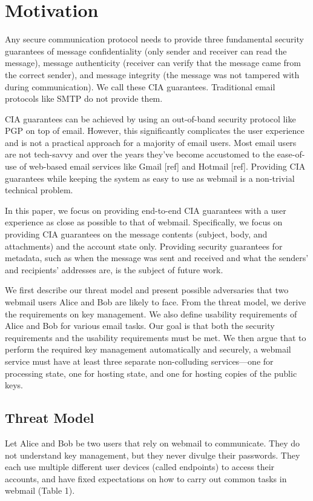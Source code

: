 \section{Motivation}

Any secure communication protocol needs to provide three 
fundamental security guarantees of message confidentiality 
(only sender and receiver can read the message), message 
authenticity (receiver can verify that the message came 
from the correct sender), and message integrity (the message 
was not tampered with during communication). We call these 
CIA guarantees. Traditional email protocols like SMTP do not
provide them.

CIA guarantees can be achieved by using an out-of-band security 
protocol like PGP on top of email. However, this significantly 
complicates the user experience and is not a practical approach 
for a majority of email users. Most email users are not tech-savvy 
and over the years they’ve become accustomed to the ease-of-use of 
web-based email services like Gmail [ref] and Hotmail [ref]. Providing CIA 
guarantees while keeping the system as easy to use as webmail is 
a non-trivial technical problem. 

In this paper, we focus on providing end-to-end CIA guarantees 
with a user experience as close as possible to that of webmail. 
Specifically, we focus on providing CIA guarantees on the message 
contents (subject, body, and attachments) and the account state only. 
Providing security guarantees for metadata, such as when the message 
was sent and received and what the senders’ and recipients’ addresses 
are, is the subject of future work.

We first describe our threat model and present possible adversaries 
that two webmail users Alice and Bob are likely to face. From the 
threat model, we derive the requirements on key management. We also 
define usability requirements of Alice and Bob for various email tasks.
 Our goal is that both the security requirements and the usability 
requirements must be met. We then argue that to perform the required 
key management automatically and securely, a webmail service must 
have at least three separate non-colluding services---one for processing 
state, one for hosting state, and one for hosting copies of the public keys. 

\subsection{Threat Model}
Let Alice and Bob be two users that rely on webmail to communicate.  They do not understand key management, but they never divulge their passwords. They each use multiple different user devices (called endpoints) to access their accounts, and have fixed expectations on how to carry out common tasks in webmail (Table 1).

